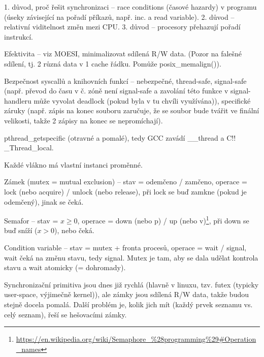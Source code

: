 \documentclass[12pt]{article}                   %
\begin{document}
        \begin{upozorneni}
            1. důvod, proč řešit synchronizaci -- race conditions (časové hazardy) v programu (úseky závisející na pořadí příkazů, např. inc. a read variable). 2. důvod -- relativní viditelnost změn mezi CPU. 3. důvod -- procesory přehazují pořadí instrukcí.

            Efektivita -- viz MOESI, minimalizovat sdílená R/W data. (Pozor na falešné sdílení, tj. 2 různá data v 1 cache řádku. Pomůže posix\_memalign()).

            Bezpečnost syscallů a knihovních funkcí -- nebezpečné, thread-safe, signal-safe (např. převod do času v č. zóně není signal-safe a zavolání této funkce v signal-handleru může vyvolat deadlock (pokud byla v tu chvíli využívána)), specifické záruky (např. zápis na konec souboru zaručuje, že se soubor bude tvářit ve finální velikosti, takže 2 zápisy na konec se nepromíchají).
        \end{upozorneni}

        \begin{definice}
            pthread\_getspecific (otravné a pomalé), tedy GCC zavádí \_\_thread a C!! \_Thread\_local.

            Každé vlákno má vlastní instanci proměnné.
        \end{definice}

        \begin{definice}
            Zámek (mutex = mutual exclusion) -- stav = odemčeno / zamčeno, operace = lock (nebo acquire) / unlock (nebo release), při lock se buď zamkne (pokud je odemčený), jinak se čeká.

            Semafor -- stav = $x ≥ 0$, operace = down (nebo p) / up (nebo v)\footnote{\url{https://en.wikipedia.org/wiki/Semaphore\_\%28programming\%29\#Operation\_names}}, při down se buď sníží ($x > 0$), nebo čeká.

            Condition variable -- stav = mutex + fronta procesů, operace = wait / signal, wait čeká na změnu stavu, tedy signal. Mutex je tam, aby se dala udělat kontrola stavu a wait atomicky (= dohromady).

            Synchronizační primitiva jsou dnes již rychlá (hlavně v linuxu, tzv. futex (typicky user-space, výjimečně kernel)), ale zámky jsou sdílená R/W data, takže budou stejně docela pomalá. Další problém je, kolik jich mít (každý prvek seznamu vs. celý seznam), řeší se hešovacími zámky. 
        \end{definice}
\end{document}
